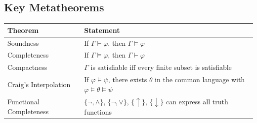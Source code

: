 \subsection{Key Metatheorems}

\begin{center}
\renewcommand{\arraystretch}{1.3}
\begin{tabular}{|l|p{9cm}|}
\hline
\textbf{Theorem} & \textbf{Statement} \\
\hline
Soundness & If $\Gamma \vdash \varphi$, then $\Gamma \models \varphi$ \\
\hline
Completeness & If $\Gamma \models \varphi$, then $\Gamma \vdash \varphi$ \\
\hline
Compactness & $\Gamma$ is satisfiable iff every finite subset is satisfiable \\
\hline
Craig's Interpolation & If $\varphi \models \psi$, there exists $\theta$ in the common
language with $\varphi \models \theta \models \psi$ \\
\hline
Functional Completeness & $\{\neg, \wedge\}$, $\{\neg, \vee\}$, $\{\uparrow\}$, $\{\downarrow\}$
can express all truth functions \\
\hline
\end{tabular}
\end{center}
